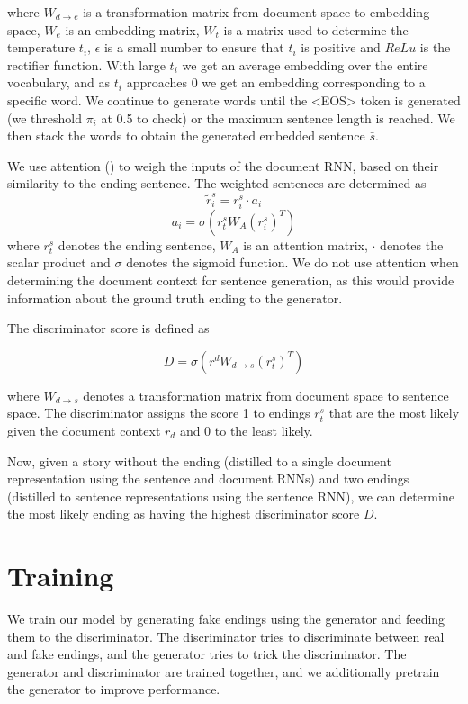 \documentclass{article}
\begin{document}
where $W_{d \rightarrow e}$ is a transformation matrix from document space to embedding space, $W_{e}$ is an embedding matrix, $W_{t}$ is a matrix used to determine the temperature $t_{i}$, $\epsilon$ is a small number to ensure that $t_{i}$ is positive and $ReLu$ is the rectifier function. With large $t_{i}$ we get an average embedding over the entire vocabulary, and as $t_{i}$ approaches 0 we get an embedding corresponding to a specific word. We continue to generate words until the <EOS> token is generated (we threshold $\pi_{i}$ at 0.5 to check) or the maximum sentence length is reached. We then stack the words to obtain the generated embedded sentence $\bar{s}$.

We use attention (\cite{P16-1122}) to weigh the inputs of the document RNN, based on their similarity to the ending sentence. The weighted sentences are determined as
$$ \tilde{r}^{s}_{i} = r^{s}_{i} \cdot a_{i} $$
$$ a_{i} = \sigma(r^{s}_{t}W_{A}(r^{s}_{i})^{T}) $$
where $r^{s}_{t}$ denotes the ending sentence, $W_{A}$ is an attention matrix, $\cdot$ denotes the scalar product and $\sigma$ denotes the sigmoid function. We do not use attention when determining the document context for sentence generation, as this would provide information about the ground truth ending to the generator.

The discriminator score is defined as 

$$ D = \sigma(r^{d}W_{d \rightarrow s}(r^{s}_{t})^{T} )$$

where $W_{d \rightarrow s}$ denotes a transformation matrix from document space to sentence space. The discriminator assigns the score 1 to endings $r^{s}_{t}$ that are the most likely given the document context $r_{d}$ and 0 to the least likely.

Now, given a story without the ending (distilled to a single document representation using the sentence and document RNNs) and two endings (distilled to sentence representations using the sentence RNN), we can determine the most likely ending as having the highest discriminator score $D$. 
\section{Training}
We train our model by generating fake endings using the generator and feeding them to the discriminator. The discriminator tries to discriminate between real and fake endings, and the generator tries to trick the discriminator. The generator and discriminator are trained together, and we additionally pretrain the generator to improve performance.
\end{document}
